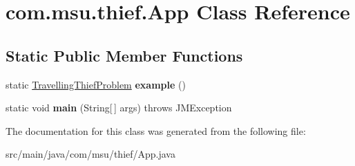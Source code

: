 \hypertarget{classcom_1_1msu_1_1thief_1_1App}{\section{com.\-msu.\-thief.\-App Class Reference}
\label{classcom_1_1msu_1_1thief_1_1App}
}
\subsection*{Static Public Member Functions}
\begin{DoxyCompactItemize}
\item 
\hypertarget{classcom_1_1msu_1_1thief_1_1App_acbac2a1ca0853656eadc499320de6e63}{static \hyperlink{classcom_1_1msu_1_1thief_1_1problems_1_1TravellingThiefProblem}{Travelling\-Thief\-Problem} {\bfseries example} ()}\label{classcom_1_1msu_1_1thief_1_1App_acbac2a1ca0853656eadc499320de6e63}

\item 
\hypertarget{classcom_1_1msu_1_1thief_1_1App_a8ab0d5db89bc845332a0c4bb5c4e53aa}{static void {\bfseries main} (String\mbox{[}$\,$\mbox{]} args)  throws J\-M\-Exception }\label{classcom_1_1msu_1_1thief_1_1App_a8ab0d5db89bc845332a0c4bb5c4e53aa}

\end{DoxyCompactItemize}


The documentation for this class was generated from the following file\-:\begin{DoxyCompactItemize}
\item 
src/main/java/com/msu/thief/App.\-java\end{DoxyCompactItemize}
